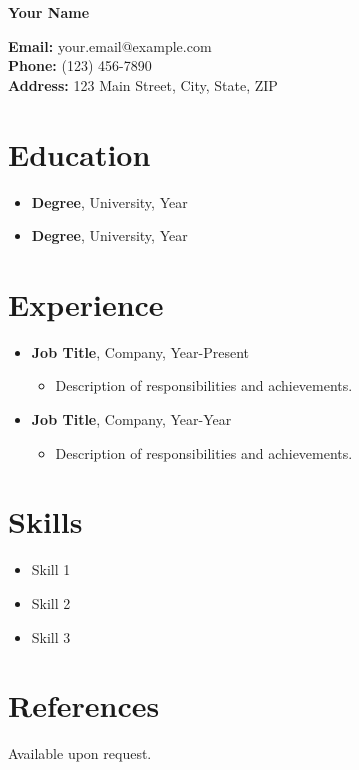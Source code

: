 \documentclass{article}
\makeatletter
\newcommand{\name}{Your Name}
\newcommand{\email}{your.email@example.com}
\newcommand{\phone}{(123) 456-7890}
\newcommand{\address}{123 Main Street, City, State, ZIP}
\makeatother
\begin{document}
\begin{center}
    \textbf{\Huge \name}
\end{center}

\begin{flushleft}
    \textbf{Email:} \email \\
    \textbf{Phone:} \phone \\
    \textbf{Address:} \address
\end{flushleft}

\section*{Education}
\begin{itemize}[leftmargin=1cm]
    \item \textbf{Degree}, University, Year
    \item \textbf{Degree}, University, Year
\end{itemize}

\section*{Experience}
\begin{itemize}[leftmargin=1cm]
    \item \textbf{Job Title}, Company, Year-Present
    \begin{itemize}
        \item Description of responsibilities and achievements.
    \end{itemize}
    \item \textbf{Job Title}, Company, Year-Year
    \begin{itemize}
        \item Description of responsibilities and achievements.
    \end{itemize}
\end{itemize}

\section*{Skills}
\begin{itemize}[leftmargin=1cm]
    \item Skill 1
    \item Skill 2
    \item Skill 3
\end{itemize}

\section*{References}
Available upon request.
\end{document}
